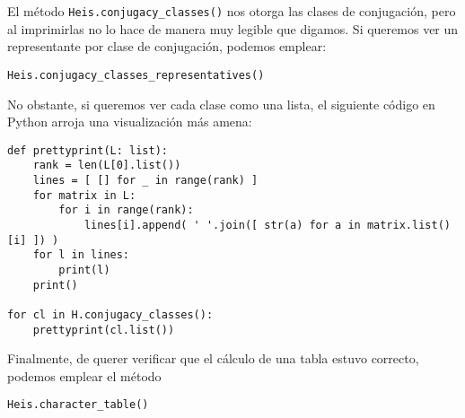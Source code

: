 \documentclass[11pt, reqno]{amsart}
\begin{document}
\begin{additional}
El método \texttt{Heis.conjugacy_classes()} nos otorga las clases de conjugación, pero al imprimirlas no lo hace de manera muy legible que digamos.
Si queremos ver un representante por clase de conjugación, podemos emplear:
\begin{verbatim}
Heis.conjugacy_classes_representatives()
\end{verbatim}
No obstante, si queremos ver cada clase como una lista, el siguiente código en \textsf{Python} arroja una visualización más amena:
\begin{verbatim}
def prettyprint(L: list):
    rank = len(L[0].list())
    lines = [ [] for _ in range(rank) ]
    for matrix in L:
        for i in range(rank):
            lines[i].append( ' '.join([ str(a) for a in matrix.list()[i] ]) )
    for l in lines:
        print(l)
    print()

for cl in H.conjugacy_classes():
    prettyprint(cl.list())
\end{verbatim}
Finalmente, de querer verificar que el cálculo de una tabla estuvo correcto, podemos emplear el método
\begin{verbatim}
Heis.character_table()
\end{verbatim}

\printbibliography
\end{additional}
\end{document}
